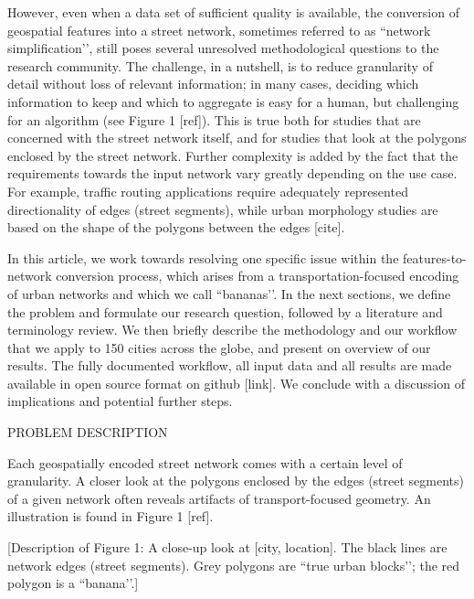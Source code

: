 However, even when a data set of sufficient quality is available, the conversion of geospatial features into a street network, sometimes referred to as ``network simplification’’, still poses several unresolved methodological questions to the research community. The challenge, in a nutshell, is to reduce granularity of detail without loss of relevant information; in many cases, deciding which information to keep and which to aggregate is easy for a human, but challenging for an algorithm (see Figure 1 [ref]). This is true both for studies that are concerned with the street network itself, and for studies that look at the polygons enclosed by the street network. Further complexity is added by the fact that the requirements towards the input network vary greatly depending on the use case. For example, traffic routing applications require adequately represented directionality of edges (street segments), while urban morphology studies are based on the shape of the polygons between the edges [cite]. 
    
In this article, we work towards resolving one specific issue within the features-to-network conversion process, which arises from a transportation-focused encoding of urban networks and which we call ``bananas’’. In the next sections, we define the problem and formulate our research question, followed by a literature and terminology review. We then briefly describe the methodology and our workflow that we apply to 150 cities across the globe, and present on overview of our results. The fully documented workflow, all input data and all results are made available in open source format on github [link]. We conclude with a discussion of implications and potential further steps.
    
    
PROBLEM DESCRIPTION


Each geospatially encoded street network comes with a certain level of granularity. A closer look at the polygons enclosed by the edges (street segments) of a given network often reveals artifacts of transport-focused geometry. An illustration is found in Figure 1 [ref]. 
    
[Description of Figure 1: A close-up look at [city, location]. The black lines are network edges (street segments). Grey polygons are ``true urban blocks’’; the red polygon is a ``banana’’.]

